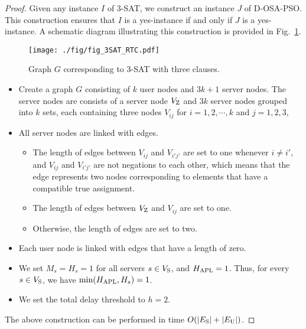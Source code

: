 \documentclass[10pt, letterpaper]{IEEEtran}
\newcommand\blue[1]{\textcolor{blue}{#1}}
\begin{document}
\begin{CJK}{UTF8}{ipxm}
\begin{proof}
  Given any instance $I$ of 3-SAT, we construct an instance $J$ of D-OSA-PSO. This construction ensures that $I$ is a yes-instance if and only if $J$ is a yes-instance. %
  A schematic diagram illustrating this construction is provided in Fig.~\ref{fig:3SAT_RTC}.
  \begin{figure}[!t]
    \begin{center}
      \texttt{[image: ./fig/fig\_3SAT\_RTC.pdf]}
    \end{center}
    \caption{Graph $G$ corresponding to 3-SAT with three clauses.}
    \label{fig:3SAT_RTC}
  \end{figure}

  \begin{itemize}
    \item Create a graph $G$ consisting of $k$ user nodes and $3k+1$ server nodes. The server nodes are consists of a server node $V_{\rm Z}$ and $3k$ server nodes grouped into $k$ sets, each containing three nodes $V_{ij}$ for $i = 1, 2, \cdots, k$ and $j = 1, 2, 3$, 
    \item All server nodes are linked with edges.
    \begin{itemize}
      \item The length of edges between $V_{ij}$ and $V_{i'j'}$ are set to one whenever $i \neq i'$, and $V_{ij}$ and $V_{i'j'}$ are not negations to each other, which means that the edge represents two nodes corresponding to elements that have a compatible true assignment.
      \item The length of edges between $V_{\rm Z}$ and $V_{ij}$ are set to one.
      \item Otherwise, the length of edges are set to two.
    \end{itemize}
    \item Each user node is linked with edges that have a length of zero.
    \item We set $M_s = H_s = 1$ for all servers $s \in V_{\rm S}$, and $H_{\rm APL} = 1$. Thus, for every $s \in V_{\rm S}$, we have $\min(H_{\rm APL}, H_s) = 1$.
    \item We set the total delay threshold to $h = 2$.
  \end{itemize}
The above construction can be performed in time $O(|E_{\rm S}| + |E_{\rm U}|)$.



\end{proof}
\end{CJK}
\end{document}
